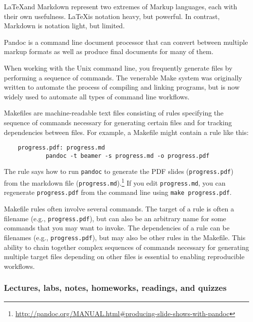 \LaTeX and Markdown represent two extremes of Markup languages, each
with their own usefulness.
\LaTeX is notation heavy, but powerful.
In contrast, Markdown is notation light, but limited.

Pandoc is a command line document processor that can convert between multiple
markup formats as well as produce final documents for many of them.

When working with the Unix command line, you frequently generate files
by performing a sequence of commands.
The venerable Make system was originally written to automate the process
of compiling and linking programs, but is now widely used to
automate all types of command line workflows.

Makefiles are machine-readable text files consisting of rules
specifying the sequence of commands necessary for generating
certain files and for tracking dependencies between files.
For example, a Makefile might contain a rule like this:
\begin{verbatim}
    progress.pdf: progress.md
            pandoc -t beamer -s progress.md -o progress.pdf
\end{verbatim}
The rule says how to run \texttt{pandoc} to generate the PDF slides (\texttt{progress.pdf}) from the
markdown file (\texttt{progress.md}).\footnote{\url{http://pandoc.org/MANUAL.html\#producing-slide-shows-with-pandoc}}
If you edit \texttt{progress.md}, you can regenerate \texttt{progress.pdf}
from the command line using \texttt{make progress.pdf}.

Makefile rules often involve several commands.
The target of a rule is often a filename (e.g., \texttt{progress.pdf}), but can
also be an arbitrary name for some commands that you may want to invoke.
The dependencies of a rule can be filenames (e.g., \texttt{progress.pdf}), but
may also be other rules in the Makefile.
This ability to chain together complex sequences of commands necessary for
generating multiple target files depending on other files is essential to
enabling reproducible workflows.

\subsubsection{Lectures, labs, notes, homeworks, readings, and quizzes}

